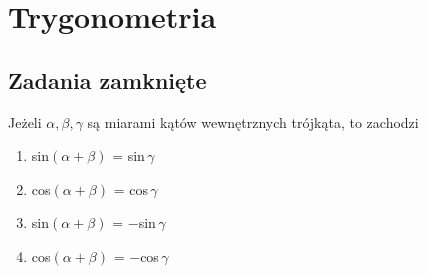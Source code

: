 \setcounter{parc}{0}
\addtocounter{chapc}{1}

\chapter{Trygonometria}

\section{Zadania zamknięte}

\zadanie Jeżeli $\alpha, \beta, \gamma$ są miarami kątów wewnętrznych trójkąta, to zachodzi
\begin{enumerate}[label=\alph*)]
	\item sin$(\alpha + \beta)$ = sin\,$\gamma$ %
	\item cos$(\alpha + \beta)$ = cos\,$\gamma$
	\item sin$(\alpha + \beta)$ = $-$sin\,$\gamma$
	\item cos$(\alpha + \beta)$ = $-$cos\,$\gamma$
\end{enumerate}